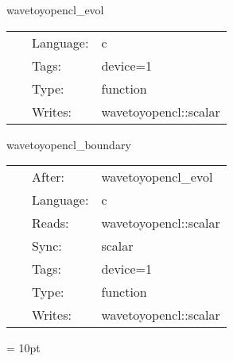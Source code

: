 
\hspace{5mm} wavetoyopencl\_evol 

\hspace{5mm}{\it evolve scalar wave } 


\hspace{5mm}

 \begin{tabular*}{160mm}{cll} 
~ & Language:  & c \\ 
~ & Tags:  & device=1 \\ 
~ & Type:  & function \\ 
~ & Writes:  & wavetoyopencl::scalar \\ 
\end{tabular*} 


\vspace{5mm}


\hspace{5mm} wavetoyopencl\_boundary 

\hspace{5mm}{\it boundary conditions for scalar wave } 


\hspace{5mm}

 \begin{tabular*}{160mm}{cll} 
~ & After:  & wavetoyopencl\_evol \\ 
~ & Language:  & c \\ 
~ & Reads:  & wavetoyopencl::scalar \\ 
~ & Sync:  & scalar \\ 
~ & Tags:  & device=1 \\ 
~ & Type:  & function \\ 
~ & Writes:  & wavetoyopencl::scalar \\ 
\end{tabular*} 



\vspace{5mm}\parskip = 10pt 
